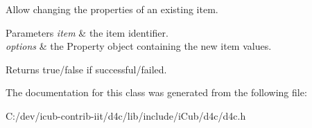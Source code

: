 Allow changing the properties of an existing item. 


\begin{DoxyParams}{Parameters}
{\em item} & the item identifier. \\
\hline
{\em options} & the Property object containing the new item values. \\
\hline
\end{DoxyParams}
\begin{DoxyReturn}{Returns}
true/false if successful/failed. 
\end{DoxyReturn}


The documentation for this class was generated from the following file\+:\begin{DoxyCompactItemize}
\item 
C\+:/dev/icub-\/contrib-\/iit/d4c/lib/include/i\+Cub/d4c/d4c.\+h\end{DoxyCompactItemize}
